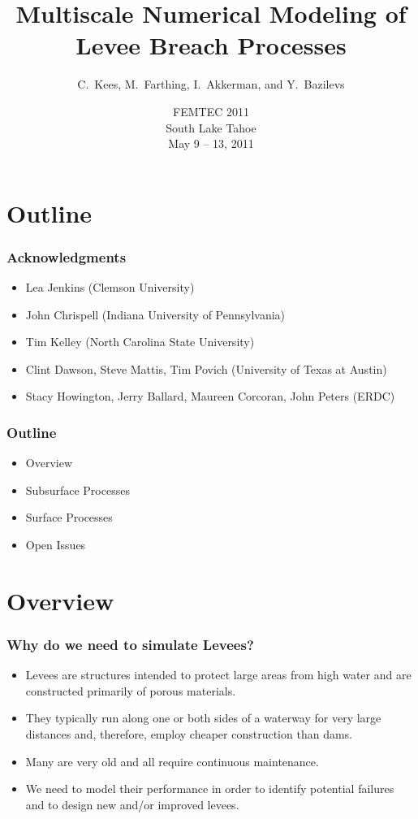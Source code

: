 \documentclass{beamer}
\title[petsc4py]{Multiscale Numerical Modeling of Levee Breach Processes}
\author[C.~Kees \and M.~Farthing]%
{
  C.~Kees\inst{1}, M.~Farthing\inst{1}, I.~Akkerman\inst{1}\inst{,2}, and Y.~Bazilevs\inst{2}\\ 
  \email{chris.kees@us.army.mil} 
}
\institute[ERDC]
{
 \inst{1}Coastal and Hydraulics Laboratory\\
  US Army Engineer Research and Development Center\\
  Vicksburg, MS, USA\\[10pt]
 \inst{2}Department of Structural Engineering\\
  University of Caifornia\\
  San Diego, CA, USA
}
\date [FEMTEC '11]
{
  FEMTEC 2011\\
  South Lake Tahoe\\
  May 9 -- 13, 2011
}
\begin{document}
\begin{frame}
  \titlepage
\end{frame}

\section*{Outline}

\begin{frame}
\frametitle{Acknowledgments}
\begin{itemize}
\item Lea Jenkins (Clemson University)
\item John Chrispell (Indiana University of Pennsylvania)
\item Tim Kelley (North Carolina State University)
\item Clint Dawson, Steve Mattis, Tim Povich (University of Texas at Austin)
\item Stacy Howington, Jerry Ballard, Maureen Corcoran, John Peters (ERDC)
\end{itemize}
\end{frame}


\begin{frame}
  \frametitle{Outline}
  \begin{itemize}
    \item Overview
    \item Subsurface Processes
    \item Surface Processes
    \item Open Issues
  \end{itemize}
\end{frame}

\section{Overview}

\begin{frame}
  \frametitle{Why do we need to simulate Levees?}
  \begin{itemize}
  \item Levees are structures intended to protect large areas from
    high water and are constructed primarily of porous materials.
  \item They typically run along one or both sides of a waterway for very
    large distances and, therefore, employ cheaper construction
    than dams.
  \item Many are very old and all require continuous maintenance.
  \item We need to model their performance in order to identify
    potential failures and to design new and/or improved levees.
  \end{itemize}
\end{frame}
\end{document}
